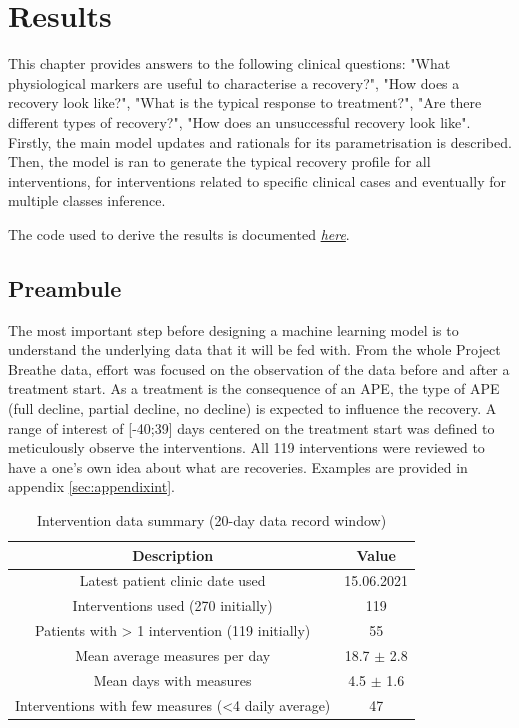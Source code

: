 \chapter{Results}
This chapter provides answers to the following clinical questions: "What physiological markers are useful to characterise a recovery?", "How does a recovery look like?", "What is the typical response to treatment?", "Are there different types of recovery?", "How does an unsuccessful recovery look like". Firstly, the main model updates and rationals for its parametrisation is described. Then, the model is ran to generate the typical recovery profile for all interventions, for interventions related to specific clinical cases and eventually for multiple classes inference. 

The code used to derive the results is documented \href{https://tristantreb.github.io/pdm/}{\textit{here}}.

\section{Preambule}
The most important step before designing a machine learning model is to understand the underlying data that it will be fed with. From the whole Project Breathe data, effort was focused on the observation of the data before and after a treatment start. As a treatment is the consequence of an APE, the type of APE (full decline, partial decline, no decline) is expected to influence the recovery. A range of interest of [-40;39] days centered on the treatment start was defined to meticulously observe the interventions. All 119 interventions were reviewed to have a one's own idea about what are recoveries. Examples are provided in appendix \ref{sec:appendixint}.

    \begin{table}[H]
        \centering
        \begin{tabular}{c|c}
         \hline
        \textbf{Description} & \textbf{Value}  \\
        \hline
        Latest patient clinic date used & 15.06.2021 \\
        Interventions used (270 initially) & 119 \\
        Patients with > 1 intervention (119 initially) & 55 \\
        Mean average measures per day & 18.7 $\pm$ 2.8 \\
        Mean days with measures & 4.5 $\pm$ 1.6 \\
        Interventions with few measures (<4 daily average) & 47 \\
        \hline
        \end{tabular}
        \caption{Intervention data summary (20-day data record window)}
        \label{tab:intrdata}
    \end{table}


